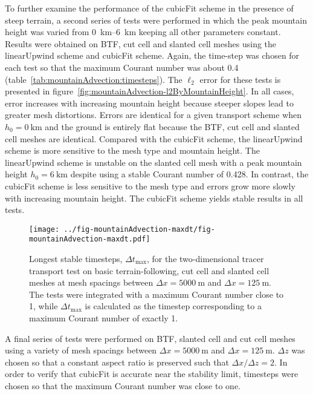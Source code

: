 To further examine the performance of the cubicFit scheme in the presence of steep terrain, a second series of tests were performed in which the peak mountain height was varied from \SIrange{0}{6}{\kilo\meter} keeping all other parameters constant.
Results were obtained on BTF, cut cell and slanted cell meshes using the linearUpwind scheme and cubicFit scheme.  Again, the time-step was chosen for each test so that the maximum Courant number was about \num{0.4} (table~\ref{tab:mountainAdvection:timesteps}).  The $\ell_2$ error for these tests is presented in figure~\ref{fig:mountainAdvection-l2ByMountainHeight}.
In all cases, error increases with increasing mountain height because steeper slopes lead to greater mesh distortions.
Errors are identical for a given transport scheme when $h_0 = \SI{0}{\kilo\meter}$ and the ground is entirely flat because the BTF, cut cell and slanted cell meshes are identical.
Compared with the cubicFit scheme, the linearUpwind scheme is more sensitive to the mesh type and mountain height.  The linearUpwind scheme is unstable on the slanted cell mesh with a peak mountain height $h_0 = \SI{6}{\kilo\meter}$ despite using a stable Courant number of \num{0.428}.
In contrast, the cubicFit scheme is less sensitive to the mesh type and errors grow more slowly with increasing mountain height.  The cubicFit scheme yields stable results in all tests.

\begin{figure}
	\centering
	\texttt{[image: ../fig-mountainAdvection-maxdt/fig-mountainAdvection-maxdt.pdf]}
	\caption{Longest stable timesteps, $\Delta t_\mathrm{max}$, for the two-dimensional tracer transport test on basic terrain-following, cut cell and slanted cell meshes at mesh spacings between $\Delta x = \SI{5000}{\meter}$ and $\Delta x = \SI{125}{\meter}$.  The tests were integrated with a maximum Courant number close to 1, while $\Delta t_\mathrm{max}$ is calculated as the timestep corresponding to a maximum Courant number of exactly 1.
	}
	\label{fig:mountainAdvection-maxdt}
\end{figure}

A final series of tests were performed on BTF, slanted cell and cut cell meshes using a variety of mesh spacings between $\Delta x = \SI{5000}{\meter}$ and $\Delta x = \SI{125}{\meter}$.  $\Delta z$ was chosen so that a constant aspect ratio is preserved such that $\Delta x / \Delta z = 2$.  In order to verify that cubicFit is accurate near the stability limit, timesteps were chosen so that the maximum Courant number was close to one.  

